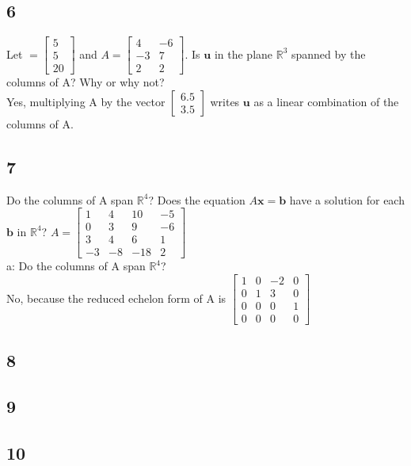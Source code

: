 \documentclass{article}
\begin{document}
\subsection*{6}
Let $\mathbf=\begin{bmatrix}5\\5\\20\end{bmatrix}$ and $A=\begin{bmatrix}4&-6\\-3&7\\2&2\end{bmatrix}$. Is $\mathbf{u}$ in the plane $\mathbb{R}^3$ spanned by the columns of A? Why or why not?
\\[0.1in]Yes, multiplying A by the vector $\begin{bmatrix}6.5\\3.5\end{bmatrix}$ writes $\mathbf{u}$ as a linear combination of the columns of A.
\subsection*{7}
Do the columns of  A span $\mathbb{R}^4$? Does the equation $A\mathbf{x} = \mathbf{b}$ have a solution for each $\mathbf{b}$ in $\mathbb{R}^4$?
$A = \begin{bmatrix}1 & 4 & 10 & -5 \\0 & 3 & 9 & -6 \\3 & 4 & 6 & 1 \\-3 & -8 & -18 & 2\end{bmatrix}$
\\a: Do the columns of  A span $\mathbb{R}^4$?
\\No, because the reduced echelon form of A is $\begin{bmatrix}1&0&-2&0\\0&1&3&0\\0&0&0&1\\0&0&0&0\end{bmatrix}$

\subsection*{8}
\subsection*{9}
\subsection*{10}
\end{document}
